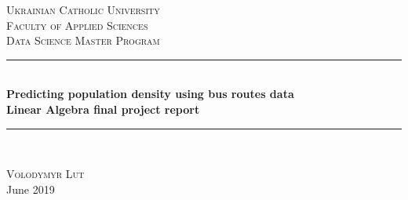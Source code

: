 \begin{titlepage}

\newcommand{\HRule}{\rule{\linewidth}{0.5mm}} %

\center %
 

\textsc{\LARGE Ukrainian Catholic University}\\[1cm] %
\textsc{\Large  Faculty of Applied Sciences}\\[0.5cm] %
\textsc{\large Data Science Master Program}\\[0.5cm] %

\vspace*{1cm}

\HRule \\[0.4cm]
{ \huge \bfseries Predicting population density using bus routes data}\\[10pt]
{\Large \bfseries Linear Algebra final project report}\\[0.4cm] %
\HRule \\[1cm]
 
\vspace*{1cm}

\textsc{Volodymyr Lut}\\[1cm] %

\vspace*{1cm}
{\large June 2019}\\[2cm] %


\end{titlepage}
